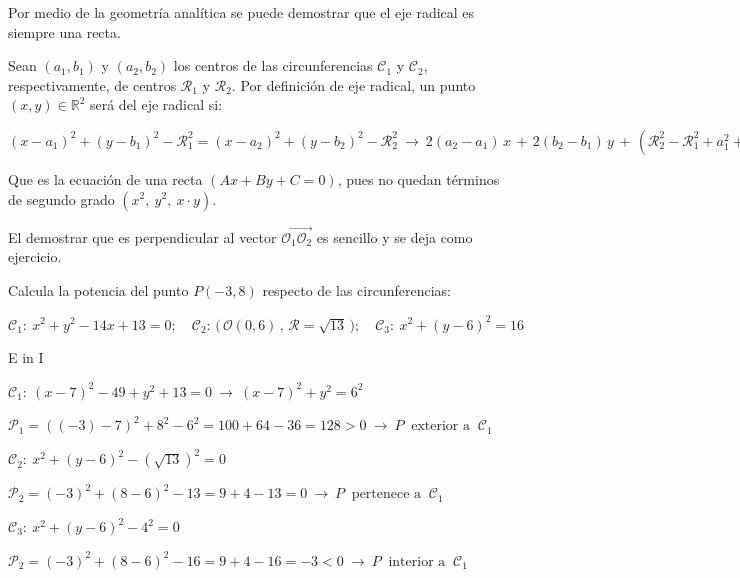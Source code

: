 \color{gris}

Por medio de la geometría analítica se puede demostrar que el eje radical es siempre una recta.

Sean $(a_1,b_1)$ y $(a_2,b_2)$ los centros de las circunferencias $\mathcal C_1$ y $\mathcal C_2$, respectivamente, de centros $\mathcal R_1$ y $\mathcal R_2$. Por definición de eje radical, un punto $(x,y)\in \mathbb R^2$ será del eje radical si:

$(x-a_1)^2+(y-b_1)^2-\mathcal R_1^2=(x-a_2)^2+(y-b_2)^2-\mathcal R_2^2 \ \to \ 
2(a_2-a_1)\, x \, + \, 2(b_2-b_1)\, y \, + \, (\mathcal R_2^2-\mathcal R_1^2+a_1^2+b_1^2-a_2^2-b_2^2)\ = \ 0$

Que es la ecuación de una recta $(Ax+By+C=0)$, pues no quedan términos de segundo grado $(x^2, \ y^2,\ x\cdot y)$.

El demostrar que es perpendicular al vector $\overrightarrow{\mathcal O_1 \mathcal O_2}$ es sencillo y se deja como ejercicio.

\color{black}

\vspace{5mm}

\begin{miejemplo}

Calcula la potencia del punto $P(-3,8)$ respecto de	las circunferencias:

\vspace{2mm} $\mathcal C_1:\ x^2+y^2-14x+13=0;\quad \mathcal C_2:\, \Big( \, \mathcal O(0,6)\, , \, \mathcal R=\sqrt{13} \, \Big); \quad \mathcal C_3:\  x^2+(y-6)^2=16$

E in I

\vspace{6mm} $\mathcal C_1:\ (x-7)^2-49+y^2+13=0 \ \to \ (x-7)^2+y^2=6^2$

\vspace{2mm} $\mathcal P_1= ((-3)-7)^2+8^2-6^2 = 100+64-36=128>0 \ \to \ P \ \text{ exterior a } \ \mathcal C_1$

\vspace{4mm} $\mathcal C_2:\ x^2+(y-6)^2-(\sqrt{13})^2=0 $

\vspace{2mm} $\mathcal P_2= (-3)^2+(8-6)^2-13 = 9+4-13=0 \ \to \ P \ \text{ pertenece a  } \ \mathcal C_1$

\vspace{4mm} $\mathcal C_3:\ x^2+(y-6)^2-4^2=0 $

\vspace{2mm} $\mathcal P_2= (-3)^2+(8-6)^2-16 =9+4-16=-3<0 \ \to \ P \ \text{ interior a } \ \mathcal C_1$
\end{miejemplo}

